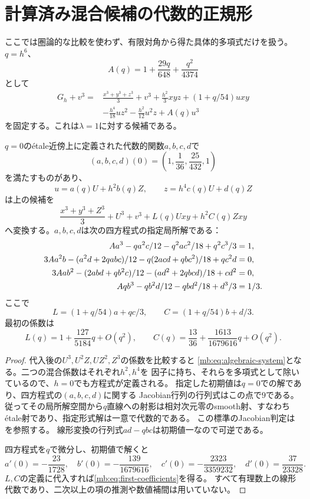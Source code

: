 \section{計算済み混合候補の代数的正規形}
\label{mb:sec:normal-form}
ここでは圏論的な比較を使わず、有限対角から得た具体的多項式だけを扱う。
$q=h^6$、
\[
 A(q)=1+\frac{29q}{648}+\frac{q^2}{4374}
\]
として
\begin{align*}
 G_h+v^3={}&\frac{x^3+y^3+z^3}{3}+v^3+
 \frac{h^2}{3}xyz+(1+q/54)uxy\\
 &-\frac{h^4}{18}uz^2-\frac{h^2}{12}u^2z+A(q)u^3
\end{align*}
を固定する。これは$\lambda=1$に対する候補である。

\begin{proposition}[四本の代数方程式による正規化]\label{mb:prop:algebraic-normal-form}
$q=0$の\'etale近傍上に定義された代数的関数$a,b,c,d$で
\[
 (a,b,c,d)(0)=\left(1,\frac1{36},\frac{25}{432},1\right)
\]
を満たすものがあり、
\[
 u=a(q)U+h^2b(q)Z,\qquad z=h^4c(q)U+d(q)Z
\]
は上の候補を
\[
 \frac{x^3+y^3+Z^3}{3}+U^3+v^3+
 L(q)Uxy+h^2C(q)Zxy
\]
へ変換する。$a,b,c,d$は次の四方程式の指定局所解である：
\begin{align}
 A a^3-qa^2c/12-q^2ac^2/18+q^2c^3/3&=1,\notag\\
 3Aa^2b-(a^2d+2qabc)/12-q(2acd+qb c^2)/18+qc^2d&=0,\notag\\
 3Aab^2-(2abd+qb^2c)/12-(ad^2+2qbc d)/18+cd^2&=0,\label{mb:eq:algebraic-system}\\
 Aq b^3-qb^2d/12-qbd^2/18+d^3/3&=1/3.\notag
\end{align}
ここで
\[
 L=(1+q/54)a+qc/3,\qquad C=(1+q/54)b+d/3.
\]
最初の係数は
\begin{equation}\label{mb:eq:first-coefficients}
 \boxed{\quad L(q)=1+\frac{127}{5184}q+O(q^2),\qquad
 C(q)=\frac{13}{36}+\frac{1613}{1679616}q+O(q^2).\quad}
\end{equation}
\end{proposition}
\begin{proof}
代入後の$U^3,U^2Z,UZ^2,Z^3$の係数を比較すると
\eqref{mb:eq:algebraic-system}となる。二つの混合係数はそれぞれ$h^2,h^4$を
因子に持ち、それらを多項式として除いているので、$h=0$でも方程式が定義される。
指定した初期値は$q=0$での解であり、四方程式の$(a,b,c,d)$に関する
Jacobian行列の行列式はこの点で$9$である。
従ってその局所解空間から$q$直線への射影は相対次元零のsmooth射、すなわち\'etale射であり、指定形式解は一意で代数的である。
この標準のJacobian判定は\cite[Tag 00T7]{MBStacks}を参照する。
線形変換の行列式$ad-qbc$は初期値一なので可逆である。

四方程式を$q$で微分し、初期値で解くと
\[
 a'(0)=-\frac{23}{1728},\quad
 b'(0)=-\frac{139}{1679616},\quad
 c'(0)=-\frac{2323}{3359232},\quad
 d'(0)=\frac{37}{23328}.
\]
$L,C$の定義に代入すれば\eqref{mb:eq:first-coefficients}を得る。
すべて有理数上の線形代数であり、二次以上の項の推測や数値補間は用いていない。
\end{proof}


